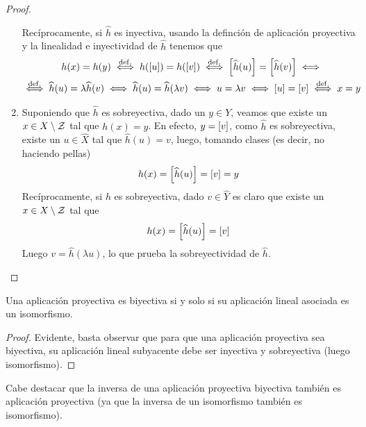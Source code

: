\begin{proof}
\begin{enumerate}
		Recíprocamente, si $\widehat{h}$ es inyectiva, usando la definción de aplicación proyectiva y la linealidad e inyectividad de $\widehat{h}$ tenemos que
		\begin{multline*}
			h(x)=h(y)\stackrel{\mathrm{def.}}{\iff} h(\left [ u \right ])=h(\left [ v \right ])\stackrel{\mathrm{def.}}{\iff}\left [ \widehat{h}(u) \right ]=\left [ \widehat{h}(v) \right ]\iff\\\stackrel{\mathrm{def.}}{\iff}\widehat{h}(u)=\lambda \widehat{h}(v)\iff\widehat{h}(u)=\widehat{h}(\lambda v)\iff u = \lambda v\iff\left [ u \right ]=\left [ v \right ]\stackrel{\mathrm{def.}}{\iff} x=y
		\end{multline*}
		\item Suponiendo que $\widehat{h}$ es sobreyectiva, dado un $y\in Y$, veamos que existe un $x\in X\setminus\mathcal{Z}$ tal que $h(x)=y$. En efecto, $y=\left [ v \right ]$, como $\widehat{h}$ es sobreyectiva, existe un $u\in \widehat{X}$ tal que $\widehat{h}(u)=v$, luego, tomando clases (es decir, no haciendo pellas)
		\begin{equation*}
			h(x)=\left [ \widehat{h}(u) \right ]=\left [ v \right ]=y
		\end{equation*}
		Recíprocamente, si $h$ es sobreyectiva, dado $v\in\widehat{Y}$ es claro que existe un $x\in X\setminus\mathcal{Z}$ tal que
		\begin{equation*}
			h(x)=\left [ \widehat{h}(u) \right ]=\left [ v \right ]
		\end{equation*}
		Luego $v=\widehat{h}(\lambda u)$, lo que prueba la sobreyectividad de $\widehat{h}$.\qedhere
	\end{enumerate}
\end{proof}
\begin{cor}[Biyectividad]\label{C4_cor_biyectividad}
	Una aplicación proyectiva es biyectiva si y solo si su aplicación lineal asociada es un isomorfismo.
\end{cor}
\begin{proof}
	Evidente, basta observar que para que una aplicación proyectiva sea biyectiva, su aplicación lineal subyacente debe ser inyectiva y sobreyectiva (luego isomorfismo).
\end{proof}
Cabe destacar que la inversa de una aplicación proyectiva biyectiva también es aplicación proyectiva (ya que la inversa de un isomorfismo también es isomorfismo).

